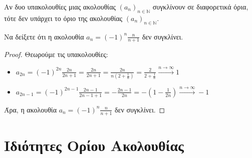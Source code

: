\documentclass[main.tex]{subfiles}
\begin{document}
\begin{rem}
    Αν δυο υπακολουθίες μιας ακολουθίας $ (a_{n})_{n \in \mathbb{N}} $ συγκλίνουν 
    σε διαφορετικά όρια, τότε δεν υπάρχει το όριο της ακολουθίας 
    $ (a_{n})_{n \in \mathbb{N}} $.
\end{rem}

\begin{example}
    Να δείξετε ότι η ακολουθία $ a_{n} = (-1)^{n}\frac{n}{n+1} $ δεν συγκλίνει. 
\end{example}

\begin{proof}
\item {}
    Θεωρούμε τις υπακολουθίες:
    \begin{itemize}
        \item $ a_{2n} = (-1)^{2n} \frac{2n}{2n+1} = \frac{2n}{2n+1} = \frac{2n}{n(2+
            \frac{1}{n})} = \frac{2}{2+ \frac{1}{n}} \xrightarrow{n \to \infty} 1 $
        \item $ a_{2n-1} = (-1)^{2n-1} \frac{2n-1}{2n-1+1} = -\frac{2n-1}{2n} = 
            -\left(1 - \frac{1}{2n}\right) \xrightarrow{n \to \infty} -1  $
    \end{itemize}
    Άρα, η ακολουθία $ a_{n}= (-1)^{n} \frac{n}{n+1} $ δεν συγκλίνει.
\end{proof}



\section{Ιδιότητες Ορίου Ακολουθίας}



\end{document}
